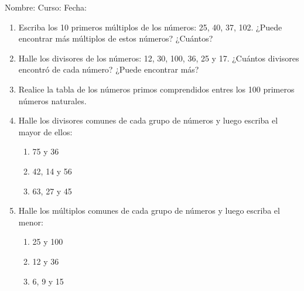 \documentclass[letterpaper,fleqn]{article}
\newcommand{\LineaNombre}{%
\par
\vspace{\baselineskip}
Nombre:\hrulefill \; Curso: \underline{\hspace*{48pt}} \; Fecha: \underline{\hspace*{2.5cm}} \relax
\par}
\begin{document}
\LineaNombre
\begin{enumerate}
 \item Escriba los 10 primeros múltiplos de los números: 25, 40, 37, 102. ¿Puede encontrar más múltiplos de estos números? ¿Cuántos?\noanswer
 \item Halle los divisores de los números: 12, 30, 100, 36, 25 y 17. ¿Cuántos divisores encontró de cada número? ¿Puede encontrar más?\noanswer
 \item Realice la tabla de los números primos comprendidos entres los 100 primeros números naturales.\noanswer
 \item Halle los divisores comunes de cada grupo de números y luego escriba el mayor de ellos:
 \begin{enumerate}
 \item 75 y 36 \noanswer
 \item 42, 14 y 56 \noanswer
 \item 63, 27 y 45\noanswer
 \end{enumerate}
 \item Halle los múltiplos comunes de cada grupo de números y luego escriba el menor:
 \begin{enumerate}
 \item 25 y 100\noanswer
 \item 12 y 36\noanswer
 \item 6, 9 y 15\noanswer
 \end{enumerate}
 \end{enumerate}
\end{document}
